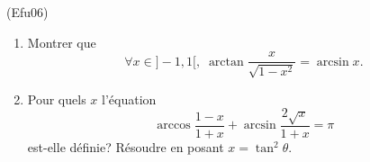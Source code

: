 \begin{tiny}(Efu06)\end{tiny} 
\begin{enumerate}
  \item Montrer que 
\begin{displaymath}
\forall x \in ]-1,1[,\; \arctan \frac{x}{\sqrt{1-x^{2}}} = \arcsin x.
\end{displaymath}
  \item Pour quels $x$ l'équation
\begin{displaymath}
\arccos \frac{1-x}{1+x} + \arcsin \frac{2\sqrt{x}}{1+x} = \pi 
\end{displaymath}
est-elle définie? Résoudre en posant $x=\tan^2 \theta$.
\end{enumerate}

